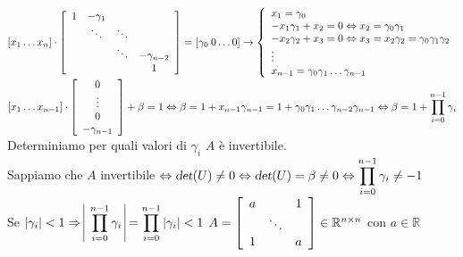 \documentclass[10pt]{book}
\begin{document}
\begin{math}
\left[x_1 \ldots x_n\right]\cdot\left[ \begin{array}{c c c c}
	1 & -\gamma_1 & & \\
	& \ddots & \ddots &  \\
	& & \ddots & -\gamma_{n-2} \\
	& & & 1
\end{array} \right]
= \left[ \gamma_0\: 0 \ldots 0 \right] \rightarrow \left\{
\begin{array}{ll}
x_1 = \gamma_0\\
-x_1\gamma_1 + x_2 = 0 \Leftrightarrow x_2 = \gamma_0\gamma_1\\
-x_2\gamma_2 + x_3 = 0 \Leftrightarrow x_3 = x_2\gamma_2 = \gamma_0\gamma_1\gamma_2\\
\vdots\\
x_{n-1} = \gamma_0\gamma_1\ldots\gamma_{n-1}
\end{array}
\right.
\end{math}\\
\begin{math}
\left[ x_1\ldots x_{n-1} \right]\cdot\left[\begin{array}{c}
 0\\\vdots\\0\\-\gamma_{n-1}
\end{array} \right] + \beta = 1 \Leftrightarrow \beta = 1 + x_{n-1}\gamma_{n-1} = 1 + \gamma_0\gamma_1\ldots\gamma_{n-2}\gamma_{n-1} \Leftrightarrow \mathlarger{ \beta = 1 + \prod_{i=0}^{n-1} \gamma_i}
\end{math}\\
Determiniamo per quali valori di $\gamma_i$ $A$ è invertibile.\\
Sappiamo che $A$ invertibile $\Leftrightarrow \textsl{det}(U) \neq 0 \Leftrightarrow\textsl{det}(U) = \beta \neq 0 \Leftrightarrow \mathlarger{\prod_{i=0}^{n-1} \gamma_i} \neq -1$\\
Se $|\gamma_i| < 1 \Rightarrow\:\vline\:\mathlarger{\prod_{i=0}^{n-1} \gamma_i}\:\vline = \mathlarger{\prod_{i=0}^{n-1} |\gamma_i|} < 1$
\begin{math}
A = \left[ \begin{array}{c c c}
	a & & 1\\
	& \ddots & \\
	1 & & a
\end{array} \right] \in \mathbb{R}^{n \times n}
\end{math}
con $a \in \mathbb{R}$
\end{document}
